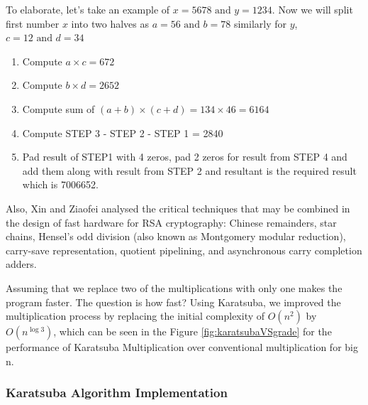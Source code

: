 \documentclass[conference]{IEEEtran}
\begin{document}
To elaborate, let's take an example of $x = 5678 \text{ and } y = 1234$. Now we will split first number $x$ into two halves as $a=56 \text{ and }b=78$ similarly for $y$, $c=12 \text{ and } d=34$

\begin{enumerate}[ {STEP }1{:} ]
	\item Compute $a \times c = 672$
	\item Compute $b \times d = 2652$
	\item Compute sum of $(a + b)\times (c +d) = 134 \times 46 = 6164$
	\item Compute STEP 3 - STEP 2 - STEP 1 = 2840
	\item Pad result of STEP1 with 4 zeros, pad 2 zeros for result from STEP 4 and add them along with result from STEP 2 and resultant is the required result which is 7006652.
\end{enumerate}

Also, Xin  and Ziaofei\cite{378085} analysed the critical techniques that may be combined in the design of fast hardware for RSA cryptography: Chinese remainders, star chains, Hensel's odd division (also known as Montgomery modular reduction), carry-save representation, quotient pipelining, and asynchronous carry completion adders.

Assuming that we replace two of the multiplications with only one makes the program faster. The question is how fast? Using Karatsuba, we improved the multiplication process by replacing the initial complexity of $O(n^{2})$ by $O(n^{\log 3})$, which can be seen in the Figure \ref{fig:karatsubaVSgrade} for the performance of Karatsuba Multiplication over conventional multiplication for big n.


\subsubsection{\bf Karatsuba Algorithm Implementation}
\end{document}
